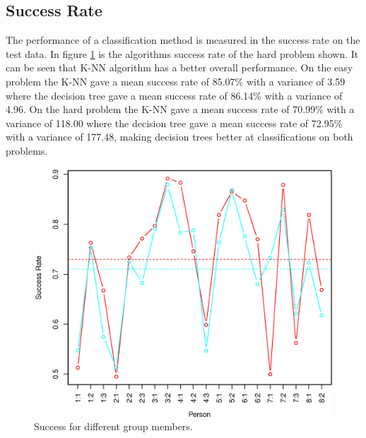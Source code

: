 \subsection{Success Rate}
The performance of a classification method is measured in the success rate on the test data.
In figure \ref{fig:success_comparison_hard} is the algorithms success rate of the hard problem shown.
It can be seen that K-NN algorithm has a better overall performance.
On the easy problem the K-NN gave a mean success rate of 
85.07\% with a variance of 3.59
where the decision tree gave a mean success rate of
86.14\% with a variance of 4.96. 
On the hard problem the K-NN gave a mean success rate of 
70.99\% with a variance of 118.00
where the decision tree gave a mean success rate of
72.95\% with a variance of 177.48, 
making decision trees better at classifications on both problems.

\begin{figure}[H]
\centering
\includegraphics[width=\textwidth]{graphics/success_comp_hard}
\caption{Success for different group members.}
\label{fig:success_comparison_hard}
\end{figure}

